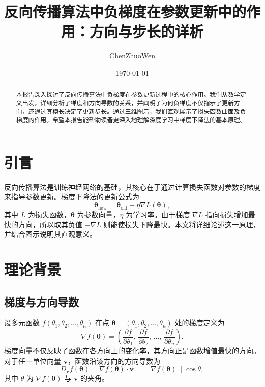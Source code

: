 \documentclass[11pt,twocolumn]{ctexart} %
\title{反向传播算法中负梯度在参数更新中的作用：方向与步长的详析}
\author{ChenZhuoWen}
\date{\today}
\begin{document}
\maketitle

\begin{abstract}
本报告深入探讨了反向传播算法中负梯度在参数更新过程中的核心作用。我们从数学定义出发，详细分析了梯度和方向导数的关系，并阐明了为何负梯度不仅指示了更新方向，还通过其模长决定了更新步长。通过三维图示，我们直观展示了损失函数曲面及负梯度的作用。希望本报告能帮助读者更深入地理解深度学习中梯度下降法的基本原理。
\end{abstract}

\section{引言}
反向传播算法是训练神经网络的基础，其核心在于通过计算损失函数对参数的梯度来指导参数更新。梯度下降法的更新公式为
\begin{equation}
    \boldsymbol{\theta}_{\text{new}} = \boldsymbol{\theta}_{\text{old}} - \eta \nabla L(\boldsymbol{\theta}),
\end{equation}
其中 \( L \) 为损失函数，\(\boldsymbol{\theta}\) 为参数向量，\(\eta\) 为学习率。由于梯度 \( \nabla L \) 指向损失增加最快的方向，所以取其负值 \( -\nabla L \) 则能使损失下降最快。本文将详细论述这一原理，并结合图示说明其直观意义。

\section{理论背景}
\subsection{梯度与方向导数}
设多元函数 \( f(\theta_1, \theta_2, \ldots, \theta_n) \) 在点 \(\boldsymbol{\theta}=(\theta_1,\theta_2,\ldots,\theta_n)\) 处的梯度定义为
\begin{equation}
    \nabla f(\boldsymbol{\theta}) = \left( \frac{\partial f}{\partial \theta_1},\, \frac{\partial f}{\partial \theta_2},\, \ldots,\, \frac{\partial f}{\partial \theta_n} \right).
\end{equation}
梯度向量不仅反映了函数在各方向上的变化率，其方向正是函数增值最快的方向。对于任一单位向量 \( \mathbf{v} \)，函数沿该方向的方向导数为
\begin{equation}
    D_{\mathbf{v}} f(\boldsymbol{\theta}) = \nabla f(\boldsymbol{\theta}) \cdot \mathbf{v} = \|\nabla f(\boldsymbol{\theta})\| \cos \theta,
\end{equation}
其中 \(\theta\) 为 \(\nabla f(\boldsymbol{\theta})\) 与 \( \mathbf{v} \) 的夹角。
\end{document}
